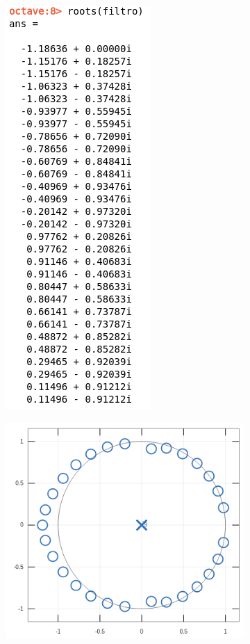 \documentclass[11pt,a4paper]{article}
\begin{document}
\begin{figure}[H]
\begin{subfigure}{.5\textwidth}
  \centering
  \includegraphics[width=.3\linewidth]{img/polos2.png}
\end{subfigure}%
\begin{subfigure}{.5\textwidth}
  \centering
  \includegraphics[width=1\linewidth]{img/polosg2.png}
\end{subfigure}
\end{figure}
\end{document}
